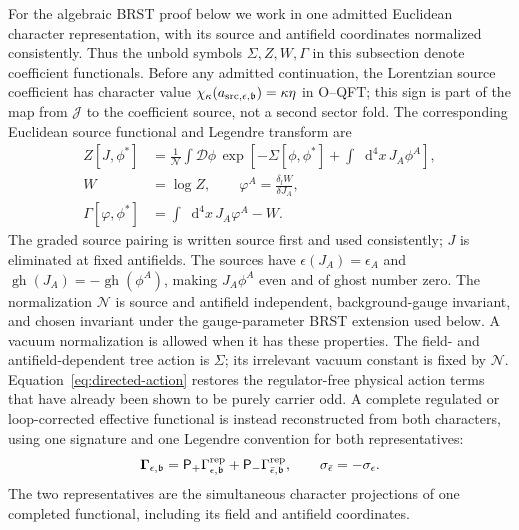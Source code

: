 \documentclass[final,5p,times,twocolumn,numbers,nopreprintline]{elsarticle}
\numberwithin{equation}{section}
\theoremstyle{definition}
\theoremstyle{remark}
\newcommand{\dd}{\mathop{}\!\mathrm d}
\newcommand{\bb}{\mathfrak b}
\newcommand{\vct}[1]{\boldsymbol{#1}}
\begin{document}
For the algebraic BRST proof below we work in one admitted
Euclidean character representation, with its source and antifield
coordinates normalized consistently. Thus the unbold symbols
\(\Sigma,Z,W,\Gamma\) in this subsection denote coefficient
functionals. Before any admitted continuation, the Lorentzian source
coefficient has character value
\(\chi_\kappa(a_{{\rm src},\epsilon,\bb})
 =\kappa\eta\) in O--QFT; this sign is part of the map from
\(\mathcal J\) to the coefficient source, not a second sector
fold. The corresponding Euclidean source functional and Legendre
transform are
\begin{align}
 Z[J,\phi^*]
 &=\frac1{\mathcal N}
     \int\mathcal D\phi\,
        \exp\left[-\Sigma[\phi,\phi^*]
                    +\int\dd^4x\,J_A\phi^A\right],
 \label{eq:Z-functional}\\
 W&=\log Z,\qquad
 \varphi^A=\frac{\delta_lW}{\delta J_A},\nonumber\\
 \Gamma[\varphi,\phi^*]&=\int\dd^4x\,J_A\varphi^A-W.
 \label{eq:Legendre}
\end{align}
The graded source pairing is written source first and used
consistently; \(J\) is eliminated at fixed antifields.
The sources have \(\epsilon(J_A)=\epsilon_A\) and
\(\operatorname{gh}(J_A)=-\operatorname{gh}(\phi^A)\), making
\(J_A\phi^A\) even and of ghost number zero.
The normalization \(\mathcal N\) is source and antifield
independent, background-gauge invariant, and chosen invariant
under the gauge-parameter BRST extension used below. A vacuum normalization is allowed
when it has these properties. The field- and antifield-dependent
tree action is \(\Sigma\); its irrelevant vacuum constant is
fixed by \(\mathcal N\).
Equation~\eqref{eq:directed-action} restores the regulator-free
physical action terms that have already been shown to be purely
carrier odd. A complete regulated or loop-corrected effective
functional is instead reconstructed from both characters, using one
signature and one Legendre convention for both representatives:
\begin{equation}
 \vct\Gamma_{\epsilon,\bb}
   =\mathsf P_+\Gamma^{\rm rep}_{\epsilon,\bb}
    +\mathsf P_-
                  \Gamma^{\rm rep}_{\bar\epsilon,\bb},
 \qquad \sigma_{\bar\epsilon}=-\sigma_\epsilon.
 \label{eq:effective-character-reconstruction}
\end{equation}
The two representatives are the simultaneous character projections of
one completed functional, including its field and antifield coordinates.
\end{document}
